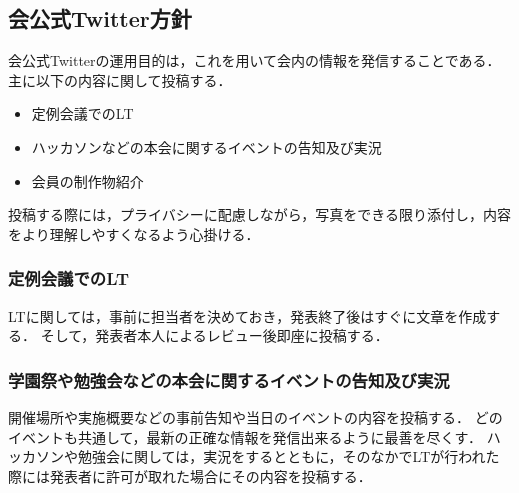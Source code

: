 \subsection*{会公式Twitter方針}



会公式Twitterの運用目的は，これを用いて会内の情報を発信することである．主に以下の内容に関して投稿する．
\begin{itemize}
\item 定例会議でのLT
\item ハッカソンなどの本会に関するイベントの告知及び実況
\item 会員の制作物紹介
\end{itemize}

投稿する際には，プライバシーに配慮しながら，写真をできる限り添付し，内容をより理解しやすくなるよう心掛ける．

\subsubsection*{定例会議でのLT}
LTに関しては，事前に担当者を決めておき，発表終了後はすぐに文章を作成する．
そして，発表者本人によるレビュー後即座に投稿する．

\subsubsection*{学園祭や勉強会などの本会に関するイベントの告知及び実況}
開催場所や実施概要などの事前告知や当日のイベントの内容を投稿する．
どのイベントも共通して，最新の正確な情報を発信出来るように最善を尽くす．
ハッカソンや勉強会に関しては，実況をするとともに，そのなかでLTが行われた際には発表者に許可が取れた場合にその内容を投稿する．
